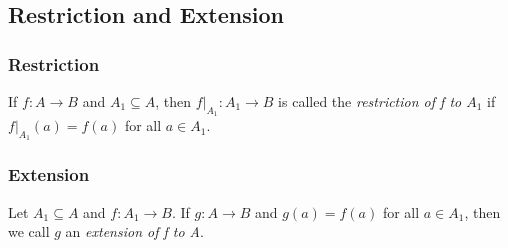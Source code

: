 \documentclass[11pt]{article}
\begin{document}
    \subsection{Restriction and Extension}

    \subsubsection{Restriction}

    If \(f: A \rightarrow B\) and \(A_1 \subseteq A\), then \(f |_{A_1} : A_1 \rightarrow B\) is called the \emph{restriction of f to $A_1$} if \(f|_{A_1}(a) = f(a)\) for all \(a \in A_1\).
    
    \subsubsection{Extension}

    Let \(A_1 \subseteq A\) and \(f:A_1 \rightarrow B.\) If \(g:A \rightarrow B\) and \(g(a) = f(a)\) for all \(a \in A_1\), then we call $g$ an \emph{extension of f to A}.
\end{document}
